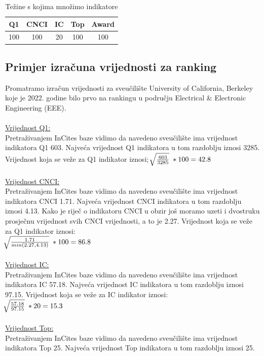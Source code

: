 \documentclass[times, utf8, zavrsni]{fer}
\begin{document}
\begin{table}[htb]
    \caption{Težine s kojima množimo indikatore}
        \label{tbl:konstante3}
        \centering
        \begin{tabular}{ccccc} \hline
        Q1 & CNCI & IC & Top & Award \\ \hline
        100&100&20&100&100\\
        \end{tabular}
        \end{table}    
        \FloatBarrier


\subsection{Primjer izračuna vrijednosti za ranking}
Promatramo izračun vrijednosti za sveučilište University of California, Berkeley koje je 2022. godine bilo prvo na rankingu u području 
Electrical \& Electronic Engineering (EEE).
\\
\\ \underline{Vrijednost Q1:} 
\\ Pretraživanjem InCites baze vidimo da navedeno sveučilište ima vrijednost indikatora Q1 603. Najveća vrijednost Q1 indikatora u tom razdoblju iznosi 3285.
Vrijednost koja se veže za Q1 indikator iznosi;  \; $\sqrt[\leftroot{-2}]{\frac{603}{3285}} \; * 100 = 42.8$
\\
\\ \underline{Vrijednost CNCI:} 
\\ Pretraživanjem InCites baze vidimo da navedeno sveučilište ima vrijednost indikatora CNCI 1.71. Najveća vrijednost CNCI indikatora u tom razdoblju iznosi 4.13.
Kako je riječ o indikatoru CNCI u obzir još moramo uzeti i dvostruku prosječnu vrijednost svih CNCI vrijednosti, a to je 2.27.
Vrijednost koja se veže za Q1 indikator iznosi: \; \\ $\sqrt[\leftroot{-2}]{\frac{1.71}{min(2.27, 4.13)}} \; * 100 = 86.8$
\\
\\ \underline{Vrijednost IC:} 
\\ Pretraživanjem InCites baze vidimo da navedeno sveučilište ima vrijednost indikatora IC 57.18. Najveća vrijednost IC indikatora u tom razdoblju iznosi 97.15.
Vrijednost koja se veže za IC indikator iznosi: \; \\ $\sqrt[\leftroot{-2}]{\frac{57.18}{97.15}} \; * 20 = 15.3$
\\
\\ \underline{Vrijednost Top:} 
\\ Pretraživanjem InCites baze vidimo da navedeno sveučilište ima vrijednost indikatora Top 25. Najveća vrijednost Top indikatora u tom razdoblju iznosi 25.
\end{document}
